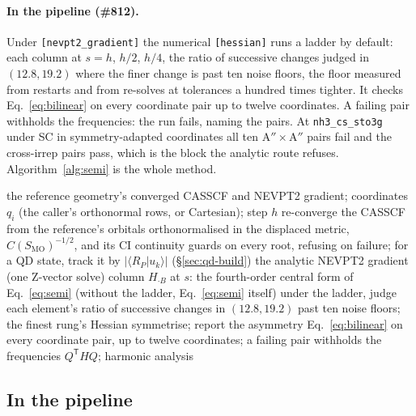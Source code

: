 \documentclass[11pt]{article}
\newcommand{\code}[1]{\texttt{#1}}
\newcommand{\T}{\mathsf T}
\begin{document}
\paragraph{In the pipeline (\#812).} Under \code{[nevpt2\_gradient]} the
numerical \code{[hessian]} runs a ladder by default: each column at $s = h$,
$h/2$, $h/4$, the ratio of successive changes judged in $(12.8, 19.2)$ where
the finer change is past ten noise floors, the floor measured from restarts
and from re-solves at tolerances a hundred times tighter. It checks
Eq.~\eqref{eq:bilinear} on every coordinate pair up to twelve coordinates.
A failing pair withholds the frequencies: the run fails, naming the pairs.
At \code{nh3\_cs\_sto3g} under SC in symmetry-adapted coordinates all ten
A$''\times$A$''$ pairs fail and the cross-irrep pairs pass, which is the
block the analytic route refuses. Algorithm~\ref{alg:semi} is the whole
method.

\begin{algorithm}[htbp]
\caption{The semi-numerical NEVPT2 Hessian (\code{pipeline/hessian}'s numerical method)}
\label{alg:semi}
\begin{algorithmic}[1]
\Require the reference geometry's converged CASSCF and NEVPT2 gradient; coordinates $q_i$ (the caller's orthonormal rows, or Cartesian); step $h$
    \State re-converge the CASSCF from the reference's orbitals orthonormalised in the displaced metric, $C(S_{\mathrm{MO}})^{-1/2}$, and its CI 
    \State continuity guards on every root, refusing on failure; for a QD state, track it by $|\langle R_P|u_k\rangle|$ (\S\ref{sec:qd-build})
    \State the analytic NEVPT2 gradient (one Z-vector solve)
  \EndFor
  \State column $H_{\cdot B}$ at $s$: the fourth-order central form of Eq.~\eqref{eq:semi} (without the ladder, Eq.~\eqref{eq:semi} itself)
\EndFor
\State under the ladder, judge each element's ratio of successive changes in $(12.8, 19.2)$ past ten noise floors; the finest rung's Hessian
\State symmetrise; report the asymmetry
\State Eq.~\eqref{eq:bilinear} on every coordinate pair, up to twelve coordinates; a failing pair withholds the frequencies
\State $Q^\T HQ$; harmonic analysis
\end{algorithmic}
\end{algorithm}

\subsection{In the pipeline}
\end{document}
